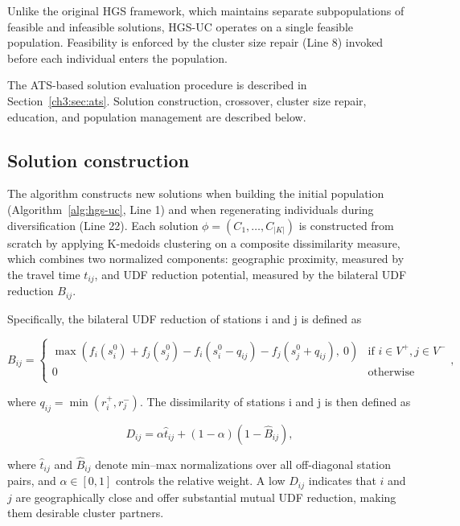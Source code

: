 Unlike the original HGS framework, which maintains separate subpopulations of feasible and infeasible solutions, HGS-UC operates on a single feasible population. Feasibility is enforced by the cluster size repair (Line 8) invoked before each individual enters the population.

The ATS-based solution evaluation procedure is described in Section~\ref{ch3:sec:ats}. Solution construction, crossover, cluster size repair, education, and population management are described below.

\subsection{Solution construction}\label{ch3:subsec:solution-construction}

The algorithm constructs new solutions when building the initial population (Algorithm~\ref{alg:hgs-uc}, Line 1) and when regenerating individuals during diversification (Line 22). Each solution $\phi =({{C}_{1}},\ldots ,{{C}_{\left| K \right|}})$ is constructed from scratch by applying K-medoids clustering on a composite dissimilarity measure, which combines two normalized components: geographic proximity, measured by the travel time ${{t}_{ij}}$, and UDF reduction potential, measured by the bilateral UDF reduction ${{B}_{ij}}$.

Specifically, the bilateral UDF reduction of stations i and j is defined as

\begin{equation}
{{B}_{ij}}=\left\{ \begin{array}{*{35}{l}}
\max ({{f}_{i}}(s_{i}^{0})+{{f}_{j}}(s_{j}^{0})-{{f}_{i}}(s_{i}^{0}-{{q}_{ij}})-{{f}_{j}}(s_{j}^{0}+{{q}_{ij}}),\ 0) & \text{if }i\in {{V}^{+}},j\in {{V}^{-}}  \\
0 & \text{otherwise}  \\
\end{array} \right.,
\end{equation}

where ${{q}_{ij}}=\min (r_{i}^{+},r_{j}^{-})$. The dissimilarity of stations i and j is then defined as

\begin{equation}
{{D}_{ij}}=\alpha {{\hat{t}}_{ij}}+(1-\alpha )(1-{{\hat{B}}_{ij}}),
\end{equation}

where ${{\hat{t}}_{ij}}$ and ${{\hat{B}}_{ij}}$ denote min--max normalizations over all off-diagonal station pairs, and $\alpha \in [0,1]$ controls the relative weight. A low ${{D}_{ij}}$ indicates that $i$ and $j$ are geographically close and offer substantial mutual UDF reduction, making them desirable cluster partners.

